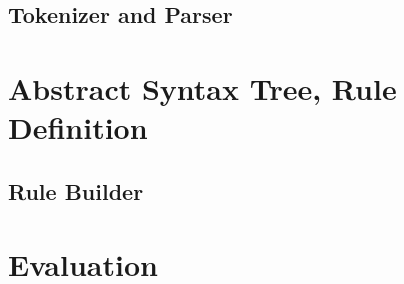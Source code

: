 \section{Tokenizer and Parser}

\chapter{Abstract Syntax Tree, Rule Definition}


\section{Rule Builder}




\chapter{Evaluation}


